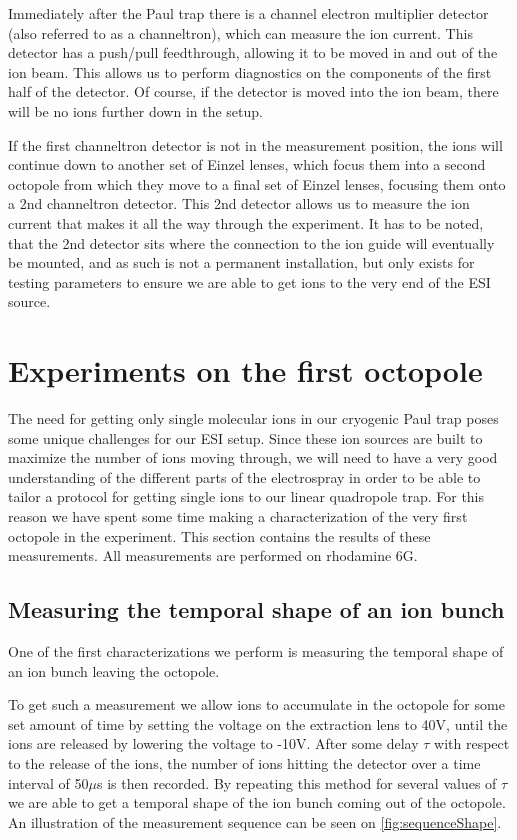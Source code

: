 Immediately after the Paul trap there is a channel electron multiplier detector (also referred to as a channeltron), which can measure the ion current. This detector has a push/pull feedthrough, allowing it to be moved in and out of the ion beam. This allows us to perform diagnostics on the components of the first half of the detector. Of course, if the detector is moved into the ion beam, there will be no ions further down in the setup.

If the first channeltron detector is not in the measurement position, the ions will continue down to another set of Einzel lenses, which focus them into a second octopole from which they move to a final set of Einzel lenses, focusing them onto a 2nd channeltron detector. This 2nd detector allows us to measure the ion current that makes it all the way through the experiment.
It has to be noted, that the 2nd detector sits where the connection to the ion guide will eventually be mounted, and as such is not a permanent installation, but only exists for testing parameters to ensure we are able to get ions to the very end of the ESI source.
\section{Experiments on the first octopole}
\label{sec:octopoleExperiments}
The need for getting only single molecular ions in our cryogenic Paul trap poses some unique challenges for our ESI setup. Since these ion sources are built to maximize the number of ions moving through, we will need to have a very good understanding of the different parts of the electrospray in order to be able to tailor a protocol for getting single ions to our linear quadropole trap.
For this reason we have spent some time making a characterization of the very first octopole in the experiment. 
This section contains the results of these measurements. All measurements are performed on rhodamine 6G.

\subsection{Measuring the temporal shape of an ion bunch}
One of the first characterizations we perform is measuring the temporal shape of an ion bunch leaving the octopole.

To get such a measurement we allow ions to accumulate in the octopole for some set amount of time by setting the voltage on the extraction lens to 40V, until the ions are released by lowering the voltage to -10V. After some delay $\tau$ with respect to the release of the ions, the number of ions hitting the detector over a time interval of 50$\mu$s is then recorded. By repeating this method for several values of $\tau$ we are able to get a temporal shape of the ion bunch coming out of the octopole.
An illustration of the measurement sequence can be seen on \cref{fig:sequenceShape}. 

